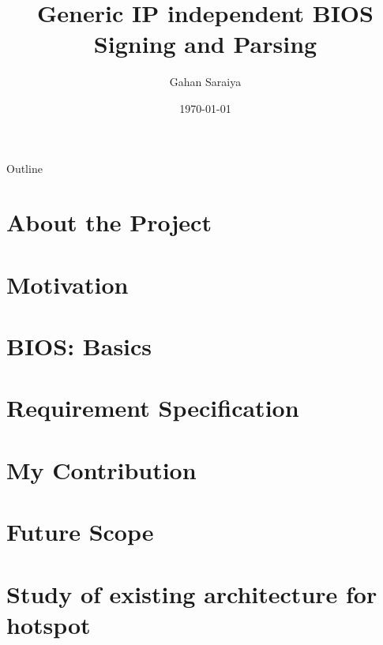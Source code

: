\documentclass{beamer}
\title{Generic IP independent BIOS Signing and Parsing}
\date{\today}
\author[Gahan Saraiya]{Gahan Saraiya}
\institute[18MCEC10]
{
  Institute of Technology\\
  Nirma University
}
\begin{document}
\begin{frame}
\titlepage
\end{frame}


    
\begin{frame}{Outline}
    \tableofcontents
\end{frame}

\section{About the Project}


\section{Motivation}


\section{BIOS: Basics}
% 


\section{Requirement Specification}


\section{My Contribution}


\section{Future Scope}


\section{Study of existing architecture for hotspot}

\end{document}
